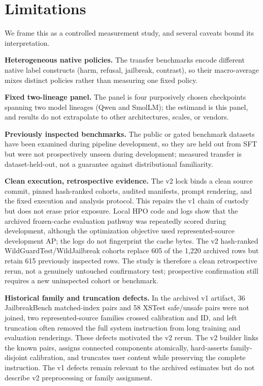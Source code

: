 \documentclass[11pt]{article}
\begin{document}
\section{Limitations}
\label{sec:limitations}

We frame this as a controlled measurement study, and several caveats bound its interpretation.

\textbf{Heterogeneous native policies.} The transfer benchmarks encode different native label constructs (harm, refusal, jailbreak, contrast), so their macro-average mixes distinct policies rather than measuring one fixed policy.

\textbf{Fixed two-lineage panel.} The panel is four purposively chosen checkpoints spanning two model lineages (Qwen and SmolLM); the estimand is this panel, and results do not extrapolate to other architectures, scales, or vendors.

\textbf{Previously inspected benchmarks.} The public or gated benchmark datasets have been examined during pipeline development, so they are held out from SFT but were not prospectively unseen during development; measured transfer is dataset-held-out, not a guarantee against distributional familiarity.

\textbf{Clean execution, retrospective evidence.} The v2 lock binds a clean source commit, pinned hash-ranked cohorts, audited manifests, prompt rendering, and the fixed execution and analysis protocol. This repairs the v1 chain of custody but does not erase prior exposure. Local HPO code and logs show that the archived frozen-cache evaluation pathway was repeatedly scored during development, although the optimization objective used represented-source development AP; the logs do not fingerprint the cache bytes. The v2 hash-ranked WildGuardTest/WildJailbreak cohorts replace 605 of the 1{,}220 archived rows but retain 615 previously inspected rows. The study is therefore a clean retrospective rerun, not a genuinely untouched confirmatory test; prospective confirmation still requires a new uninspected cohort or benchmark.

\textbf{Historical family and truncation defects.} In the archived v1 artifact, 36 JailbreakBench matched-index pairs and 58 XSTest safe/unsafe pairs were not joined, two represented-source families crossed calibration and ID, and left truncation often removed the full system instruction from long training and evaluation renderings. These defects motivated the v2 rerun. The v2 builder links the known pairs, assigns connected components atomically, hard-asserts family-disjoint calibration, and truncates user content while preserving the complete instruction. The v1 defects remain relevant to the archived estimates but do not describe v2 preprocessing or family assignment.
\end{document}
